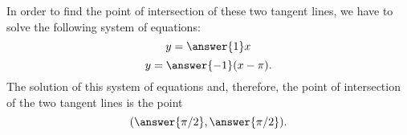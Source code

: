 \documentclass{ximera}
\begin{document}
\begin{exercise}
\begin{enumerate}
In order to find the point of intersection of these two tangent lines, we have to solve the following system of equations:
\[
y=\answer{1}x
\]
\[
y=\answer{-1}(x-\pi).
\]
The solution of this system of equations and, therefore, the point of intersection of the two tangent lines is the point
\[
(\answer{\pi/2},\answer{\pi/2}).
\]

\end{enumerate}




\end{exercise}
\end{document}
